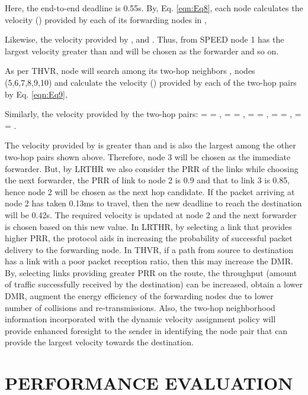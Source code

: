 \documentclass[fleqn,twoside]{article}
\begin{document}
Here, the end-to-end deadline is 0.55s. By, Eq. \ref{eqn:Eq8}, each node calculates the velocity () provided by each
of its forwarding nodes in ,

Likewise, the velocity provided by ,  
and . Thus, from SPEED node 1 has the largest velocity greater than 
and will be chosen as the forwarder and so on.

As per THVR, node  will search among its two-hop neighbors  , nodes (5,6,7,8,9,10) and calculate
the velocity () provided by each of the two-hop pairs by Eq. \ref{eqn:Eq9},

Similarly, the velocity provided by the two-hop pairs:  =  = ,  
 =  = ,  =  = ,
 =  = ,  =  = .

The velocity provided by  is greater than  and is also the largest among the other two-hop pairs shown
above. Therefore, node 3 will be chosen as the immediate forwarder. But, by LRTHR we also consider the PRR of the links while
choosing the next forwarder, the PRR of link to node 2 is 0.9 and that to link 3 is 0.85, hence node 2 will be chosen 
as the next hop candidate. If the packet arriving at node 2 has taken 0.13ms to travel, then the new deadline to
reach the destination will be 0.42s. The required velocity is updated at node 2 and the next forwarder is 
chosen based on this new value.
\vskip 2mm
In LRTHR, by selecting a link that provides higher PRR, the protocol aids in increasing the probability of successful 
packet delivery to the forwarding node. In THVR, if a path from source to destination has a link with a poor packet
reception ratio, then this may increase the DMR. By, selecting links providing greater PRR on the route, the throughput
(amount of traffic successfully received by the destination) can be increased, obtain a lower DMR, augment the energy
efficiency of the forwarding nodes due to lower number of collisions and re-transmissions. Also, the two-hop neighborhood
information incorporated with the dynamic velocity assignment policy will provide enhanced foresight to the sender in 
identifying the node pair that can provide the largest velocity towards the destination.
 \section{PERFORMANCE EVALUATION}
\end{document}
